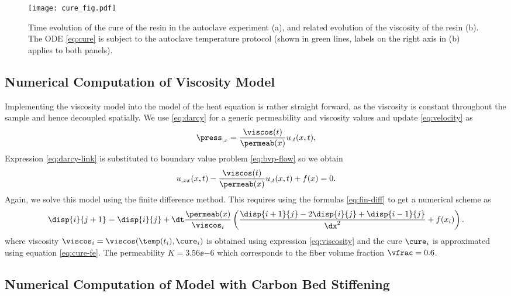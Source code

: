 \documentclass[twoside,a4paper,12pt]{article}
\begin{document}
\begin{figure}
  \centering
  \texttt{[image: cure\_fig.pdf]}
  \caption{Time evolution of the cure of the resin in the autoclave
    experiment (a), and related evolution of the viscosity of the
    resin (b). The ODE \eqref{eq:cure} is subject to the autoclave
    temperature protocol (shown in green lines, labels on the right
    axis in (b) applies to both panels).}
  \label{fig:cure-exp}
\end{figure}


\subsection{Numerical Computation of Viscosity Model}


Implementing the viscosity model into the model of the heat equation
is rather straight forward, as the viscosity is constant throughout
the sample and hence decoupled spatially. 
%
We use \eqref{eq:darcy} for a generic permeability and viscosity
values and update \eqref{eq:velocity} as
%
\begin{align}
 \press_{,x} =\frac{\viscos(t)}{\permeab(x)}    u_{,t}(x,t) ,  \label{eq:darcy-link}
\end{align}
%
Expression \eqref{eq:darcy-link} is substituted to boundary value problem \eqref{eq:bvp-flow}
so we obtain
%
\begin{align}
   u_{,xx}(x,t) - \frac{\viscos(t)}{\permeab(x)}    u_{,t}(x,t) + f(x) =0.
\end{align}
%
Again, we solve this model using the finite difference method. This
requires using the formulas \eqref{eq:fin-diff} to get a numerical scheme as
%
\begin{align}
  \disp{i}{j+1}  =   \disp{i}{j} + \dt\frac{\permeab(x)}{\viscos_i}\left(\frac{\disp{i+1}{j} - 2\disp{i}{j} + \disp{i-1}{j}}{\dx^2}   + f(x_i) \right). 
\end{align}
%
where viscosity $\viscos_i = \viscos(\temp(t_i),\cure_i)$ is obtained
using expression \eqref{eq:viscosity} and the cure $\cure_i$ is
approximated using equation \eqref{eq:cure-fe}. The permeability
$K=3.56\ee{-6}$ which corresponds to the fiber volume fraction $\vfrac = 0.6$.



\subsection{Numerical Computation of Model with Carbon Bed Stiffening}
\end{document}
